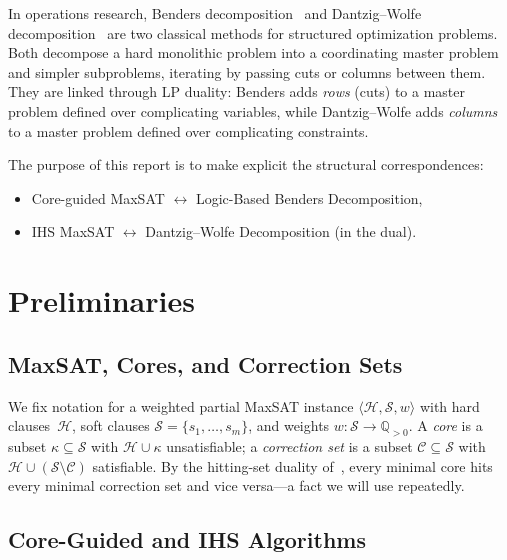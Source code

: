 \documentclass[11pt,a4paper]{article}
\begin{document}
In operations research, Benders decomposition~\citep{benders1962partitioning}
and Dantzig--Wolfe decomposition~\citep{dantzigwolfe1960} are two classical
methods for structured optimization problems. Both decompose a hard monolithic
problem into a coordinating master problem and simpler subproblems, iterating
by passing cuts or columns between them. They are linked through LP
duality: Benders adds \emph{rows} (cuts) to a master problem defined over
complicating variables, while Dantzig--Wolfe adds \emph{columns} to a master
problem defined over complicating constraints.

The purpose of this report is to make explicit the structural correspondences:
\begin{itemize}
\item Core-guided MaxSAT $\longleftrightarrow$ Logic-Based Benders Decomposition,
\item IHS MaxSAT $\longleftrightarrow$ Dantzig--Wolfe Decomposition (in the dual).
\end{itemize}

\section{Preliminaries}
\label{sec:prelim}

\subsection{MaxSAT, Cores, and Correction Sets}

We fix notation for a weighted partial MaxSAT instance
$\langle \mathcal{H}, \mathcal{S}, w \rangle$ with hard clauses~$\mathcal{H}$,
soft clauses $\mathcal{S} = \{s_1,\ldots,s_m\}$, and weights
$w : \mathcal{S} \to \mathbb{Q}_{>0}$. A \emph{core} is a subset
$\kappa \subseteq \mathcal{S}$ with $\mathcal{H} \cup \kappa$ unsatisfiable; a
\emph{correction set} is a subset $\mathcal{C} \subseteq \mathcal{S}$ with
$\mathcal{H} \cup (\mathcal{S} \setminus \mathcal{C})$ satisfiable. By the
hitting-set duality of~\citet{liffiton2008algorithms}, every minimal core hits
every minimal correction set and vice versa---a fact we will use
repeatedly.

\subsection{Core-Guided and IHS Algorithms}
\end{document}
